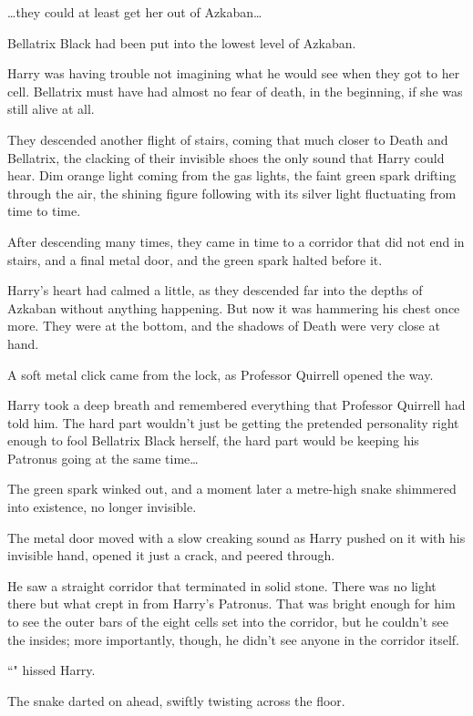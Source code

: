 {\ldots}they could at least get her out of Azkaban{\ldots}

Bellatrix Black had been put into the lowest level of Azkaban.

Harry was having trouble not imagining what he would see when they got to her cell. Bellatrix must have had almost no fear of death, in the beginning, if she was still alive at all.

They descended another flight of stairs, coming that much closer to Death and Bellatrix, the clacking of their invisible shoes the only sound that Harry could hear. Dim orange light coming from the gas lights, the faint green spark drifting through the air, the shining figure following with its silver light fluctuating from time to time.

\later

After descending many times, they came in time to a corridor that did not end in stairs, and a final metal door, and the green spark halted before it.

Harry's heart had calmed a little, as they descended far into the depths of Azkaban without anything happening. But now it was hammering his chest once more. They were at the bottom, and the shadows of Death were very close at hand.

A soft metal click came from the lock, as Professor Quirrell opened the way.

Harry took a deep breath and remembered everything that Professor Quirrell had told him. The hard part wouldn't just be getting the pretended personality right enough to fool Bellatrix Black herself, the hard part would be keeping his Patronus going at the same time{\ldots}

The green spark winked out, and a moment later a metre-high snake shimmered into existence, no longer invisible.

The metal door moved with a slow creaking sound as Harry pushed on it with his invisible hand, opened it just a crack, and peered through.

He saw a straight corridor that terminated in solid stone. There was no light there but what crept in from Harry's Patronus. That was bright enough for him to see the outer bars of the eight cells set into the corridor, but he couldn't see the insides; more importantly, though, he didn't see anyone in the corridor itself.

``" hissed Harry.

The snake darted on ahead, swiftly twisting across the floor.

